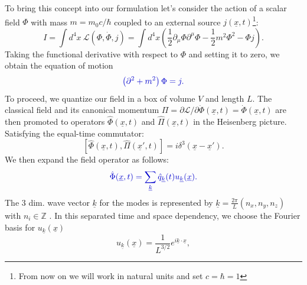 \documentclass[12pt, titlepage]{article}
\begin{document}
To bring this concept into our formulation let's consider 
the action of a scalar field $ \Phi $ with mass $ m=m_{0}c/\hbar $ coupled to an external source $ j(\underline{x},t) $\footnote{From now on we will work in natural units and set $ c=\hbar=1 $ }:
\begin{equation}\label{action_with_scalar_ex_current}
I=\int d^{4}x \ \mathcal{L}(\Phi, \dot{\Phi},j)=
\int d^{4}x 
\left(
\frac{1}{2}\partial_{\mu}\Phi\partial^{\mu}\Phi
-\frac{1}{2}m^{2}\Phi^{2}
-\Phi j
 \right)
 .
\end{equation}
Taking the functional derivative with respect to $ \Phi $ and setting it to zero, we obtain the equation of motion
\begin{equation}\label{motion_scalar}
\textcolor[RGB]{0,0,204}{
\left(
\partial^{2}+m^{2}
 \right)\Phi
 =j
 .}
\end{equation}
To proceed, we quantize our field in a box of volume $ V $ and length $ L $. The classical field and its canonical momentum $ \Pi = \partial \mathcal{L} /\partial\dot{\Phi}(\underline{x},t)=\dot{\Phi}(\underline{x},t) $ are then promoted to operators $ \hat{\Phi}(\underline{x},t) $ and  $ \hat{\Pi}(\underline{x},t) $ in the Heisenberg picture. Satisfying the equal-time commutator:
\begin{equation}
\left[
\hat{\Phi}(\underline{x},t),\hat{\Pi}(\underline{x}',t)
 \right] 
 =
 i
 \delta^{3}
 (\underline{x} - \underline{x}')
 .
\end{equation}
We then expand the field operator as follows:
\begin{equation}\label{box_quanta}
\textcolor[RGB]{0,0,204}{
\hat{\Phi} (\underline{x},t)= \sum_{\underline{k}} \hat{q}_{\underline{k}}(t)u_{\underline{k}}(\underline{x})
 .}
\end{equation}
The 3 dim. wave vector $ \underline{k} $ for the modes is represented by $ \underline{k} = \frac{2\pi}{L}(n_{x},n_{y},n_{z}) $ with $ n_{i}\in \mathbb{Z} $ . 
	In this separated time and space dependency, we choose the Fourier basis for $ u_{\underline{k}}(\underline{x}) $
\begin{equation}\label{fourierbasis}
u_{\underline{k}}(\underline{x})
=
\dfrac{1}{L^{3/2}} e^{i\underline{k}\cdot \underline{x}}
,
\end{equation}
\end{document}
